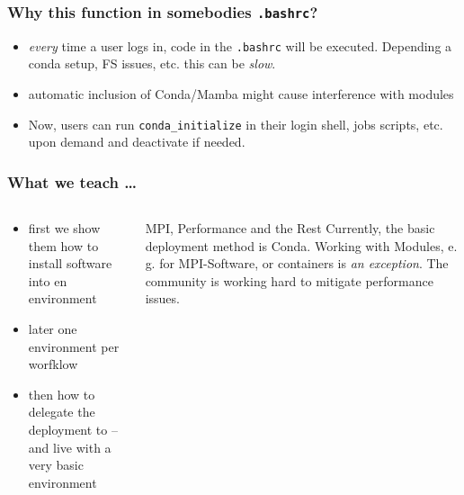\begin{frame}[fragile]
  \frametitle{Why this function in somebodies \texttt{.bashrc}?}
  \begin{docs}
  	\begin{itemize}[<+->]
  		\item \emph{every} time a user logs in, code in the \texttt{.bashrc} will be executed. Depending a conda setup, FS issues, etc. this can be \emph{slow}.
  		\item automatic inclusion of Conda/Mamba might cause interference with modules
  		\item Now, users can run \verb+conda_initialize+ in their login shell, jobs scripts, etc. upon demand and deactivate if needed.
  	\end{itemize}
  \end{docs}
\end{frame}



\begin{frame}
  \frametitle{What we teach \ldots}
  \begin{columns}
  	\begin{column}{0.5\textwidth}
  		\begin{itemize}[<+->]
  			\item first we show them how to install software into en environment
  			\item later one environment per worfklow
  			\item then how to delegate the deployment to \Snakemake -- and live with a very basic environment
  		\end{itemize}
  	\end{column}
  	\begin{column}{0.5\textwidth}
  		\pause
  		\begin{hint}{MPI, Performance and the Rest}
  			Currently, the basic deployment method is Conda. Working with Modules, e.\,g. for MPI-Software, or containers is \emph{an exception}.\newline
  			The community is working hard to mitigate performance issues.
  		\end{hint}
  	\end{column}
  \end{columns}
\end{frame}

